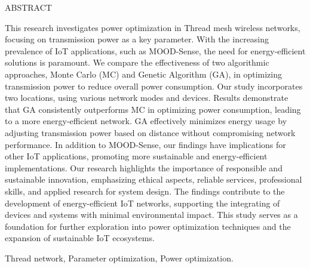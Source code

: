 \begin{center}
    ABSTRACT
\vspace{5mm} %
\end{center}

This research investigates power optimization in Thread mesh wireless networks, focusing on transmission power as a key parameter. With the increasing prevalence of IoT applications, such as MOOD-Sense, the need for energy-efficient solutions is paramount. We compare the effectiveness of two algorithmic approaches, Monte Carlo (MC) and Genetic Algorithm (GA), in optimizing transmission power to reduce overall power consumption. Our study incorporates two locations, using various network modes and devices.
Results demonstrate that GA consistently outperforms MC in optimizing power consumption, leading to a more energy-efficient network. GA effectively minimizes energy usage by adjusting transmission power based on distance without compromising network performance. In addition to MOOD-Sense, our findings have implications for other IoT applications, promoting more sustainable and energy-efficient implementations.
Our research highlights the importance of responsible and sustainable innovation, emphasizing ethical aspects, reliable services, professional skills, and applied research for system design. The findings contribute to the development of energy-efficient IoT networks, supporting the integrating of devices and systems with minimal environmental impact. This study serves as a foundation for further exploration into power optimization techniques and the expansion of sustainable IoT ecosystems.

\vspace{5mm} %
 Thread network, Parameter optimization, Power optimization.  %
